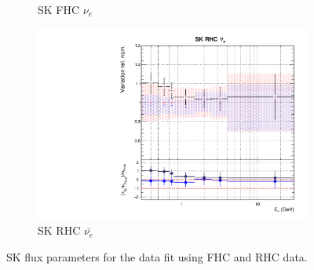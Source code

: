 \begin{figure}[t]
\begin{subfigure}{0.45\textwidth}
  \caption{SK FHC $\nu_{e}$}
\end{subfigure}
\begin{subfigure}{0.45\textwidth}
  \centering
  \includegraphics[width=0.75\linewidth]{figs/rhcmpdat28flux_15}
  \caption{SK RHC $\bar{\nu_{e}}$}
\end{subfigure}
\caption{SK flux parameters for the data fit using FHC and RHC data.}
\label{fig:rhcmpidat28SK}
\end{figure}

